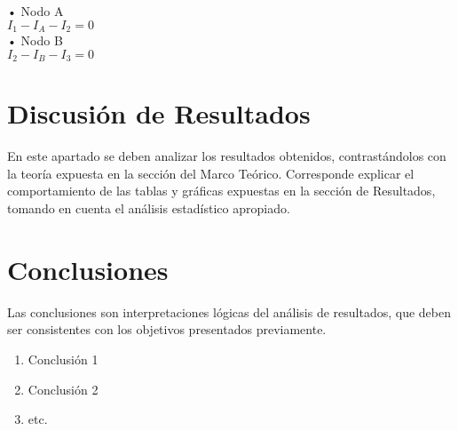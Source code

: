 \documentclass[osajnl,twocolumn,showpacs,superscriptaddress,10pt]{revtex4-1}
\begin{document}
• Nodo A\\

$I_{1} - I_{A} - I_{2} = 0$\\

• Nodo B\\

$I_{2} - I_{B} - I_{3} = 0$\\



\section{Discusión de Resultados}

    En este apartado se deben analizar los resultados obtenidos, contrastándolos con la teoría expuesta en la sección del Marco Teórico. Corresponde explicar el comportamiento de las tablas y gráficas expuestas en la sección de Resultados, tomando en cuenta el análisis estadístico apropiado.\\

\section{Conclusiones}

    Las conclusiones son interpretaciones lógicas del análisis de resultados, que deben ser consistentes con los objetivos presentados previamente.\\

\begin{enumerate}
    \item Conclusión 1
    \item Conclusión 2
    \item etc.
\end{enumerate}
\end{document}
